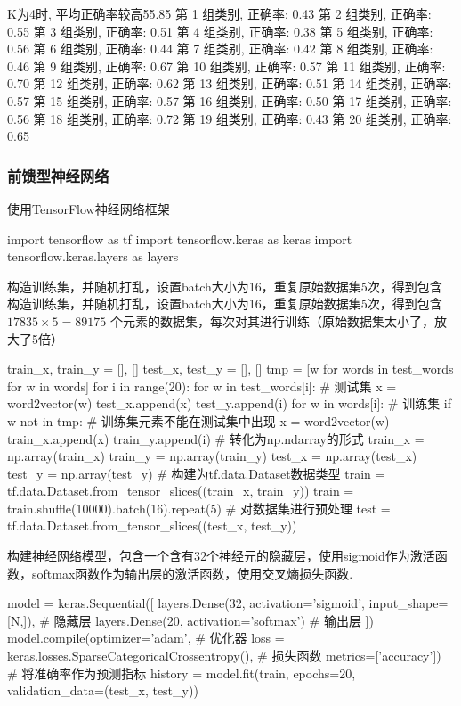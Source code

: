 \documentclass[12pt, a4paper, oneside]{ctexart}
\numberwithin{equation}{section}  %
\begin{document}
\begin{pythoncode}
K为4时, 平均正确率较高55.85%
第  1 组类别, 正确率: 0.43
第  2 组类别, 正确率: 0.55
第  3 组类别, 正确率: 0.51
第  4 组类别, 正确率: 0.38
第  5 组类别, 正确率: 0.56
第  6 组类别, 正确率: 0.44
第  7 组类别, 正确率: 0.42
第  8 组类别, 正确率: 0.46
第  9 组类别, 正确率: 0.67
第 10 组类别, 正确率: 0.57
第 11 组类别, 正确率: 0.70
第 12 组类别, 正确率: 0.62
第 13 组类别, 正确率: 0.51
第 14 组类别, 正确率: 0.57
第 15 组类别, 正确率: 0.57
第 16 组类别, 正确率: 0.50
第 17 组类别, 正确率: 0.56
第 18 组类别, 正确率: 0.72
第 19 组类别, 正确率: 0.43
第 20 组类别, 正确率: 0.65
\end{pythoncode}

\subsubsection{前馈型神经网络}
使用TensorFlow神经网络框架
\begin{pythoncode}
import tensorflow as tf
import tensorflow.keras as keras
import tensorflow.keras.layers as layers
\end{pythoncode}

构造训练集，并随机打乱，设置batch大小为16，重复原始数据集5次，得到包含
构造训练集，并随机打乱，设置batch大小为16，重复原始数据集5次，得到包含
\(17835\times 5=89175\)
个元素的数据集，每次对其进行训练（原始数据集太小了，放大了5倍）

\begin{pythoncode}
train_x, train_y = [], []
test_x, test_y = [], []
tmp = [w for words in test_words for w  in words]
for i in range(20):
    for w in test_words[i]:  # 测试集
        x = word2vector(w)
        test_x.append(x)
        test_y.append(i)
    for w in words[i]:  # 训练集
        if w not in tmp:  # 训练集元素不能在测试集中出现
            x = word2vector(w)
            train_x.append(x)
            train_y.append(i)
# 转化为np.ndarray的形式
train_x = np.array(train_x)
train_y = np.array(train_y)
test_x = np.array(test_x)
test_y = np.array(test_y)
# 构建为tf.data.Dataset数据类型
train = tf.data.Dataset.from_tensor_slices((train_x, train_y))
train = train.shuffle(10000).batch(16).repeat(5)  # 对数据集进行预处理
test = tf.data.Dataset.from_tensor_slices((test_x, test_y))
\end{pythoncode}

构建神经网络模型，包含一个含有32个神经元的隐藏层，使用sigmoid作为激活函数，softmax函数作为输出层的激活函数，使用交叉熵损失函数.

\begin{pythoncode}
model = keras.Sequential([
    layers.Dense(32, activation='sigmoid', input_shape=[N,]),  # 隐藏层
    layers.Dense(20, activation='softmax')  # 输出层
])
model.compile(optimizer='adam',  # 优化器
             loss = keras.losses.SparseCategoricalCrossentropy(),  # 损失函数
             metrics=['accuracy'])  # 将准确率作为预测指标
history = model.fit(train, epochs=20, validation_data=(test_x, test_y))
\end{pythoncode}
\end{document}
